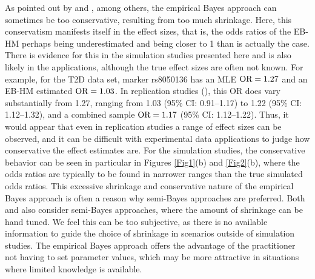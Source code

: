 \documentclass[oupdraft]{bio}
\begin{document}
As pointed out by
\citet{Duditetal02}
and
\citet{rma2003},
among others, the empirical Bayes approach can sometimes be too
conservative, resulting from too much shrinkage. Here, this
conservatism manifests itself in the effect sizes, that is,
the odds ratios of the EB-HM perhaps being underestimated and
being closer to 1 than is actually the case. There is evidence
for this in the simulation studies presented here and is
also likely in the
\citet{LW2004}
applications, although the true effect sizes are often
not known. For example, for the T2D data set, marker
rs8050136 has an MLE $\hbox{OR} = 1.27$ and an EB-HM estimated
$\hbox{OR} = 1.03$. In replication studies
(\citealp{rieger2004}),
this OR does vary substantially from 1.27, ranging from
1.03 (95\% CI: 0.91--1.17) to
1.22 (95\% CI: 1.12--1.32), and a combined sample
$\hbox{OR} = 1.17$ (95\% CI: 1.12--1.22). Thus, it would
appear that even in replication studies a range of effect
sizes can be observed, and it can be difficult with
experimental data applications to judge how conservative
the effect estimates are. For the simulation studies, the
conservative behavior can be seen in particular in
Figures \ref{Fig1}(b) and \ref{Fig2}(b), where the odds
ratios are typically to be found in narrower ranges than
the true simulated odds ratios. This excessive shrinkage
and conservative nature of the empirical Bayes approach
is often a reason why semi-Bayes approaches are preferred.
Both
\citet{tomlins2005}
and
\citet{TTC01}
also consider semi-Bayes approaches, where the amount of
shrinkage can be hand tuned. We feel this can be too
subjective, as there is no available information to guide
the choice of shrinkage in scenarios outside of simulation
studies. The empirical Bayes approach offers the advantage
of the practitioner not having to set parameter values,
which may be more attractive in situations where limited
knowledge is available.
\end{document}
